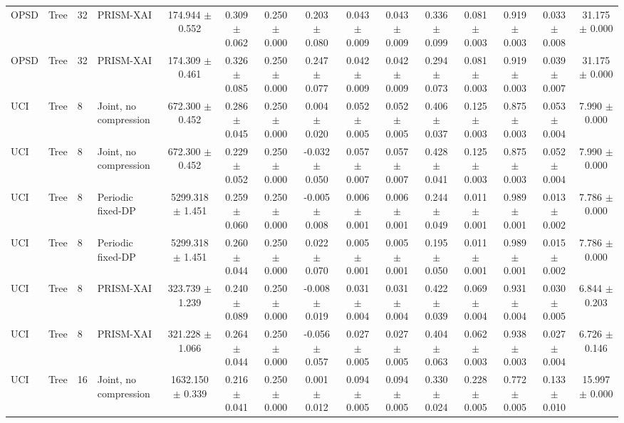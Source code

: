 \begin{table}[t]
\begin{tabular}{llllccccccccccc}
OPSD & Tree & 32 & PRISM-XAI & 174.944 $\pm$ 0.552 & 0.309 $\pm$ 0.062 & 0.250 $\pm$ 0.000 & 0.203 $\pm$ 0.080 & 0.043 $\pm$ 0.009 & 0.043 $\pm$ 0.009 & 0.336 $\pm$ 0.099 & 0.081 $\pm$ 0.003 & 0.919 $\pm$ 0.003 & 0.033 $\pm$ 0.008 & 31.175 $\pm$ 0.000 \\
OPSD & Tree & 32 & PRISM-XAI & 174.309 $\pm$ 0.461 & 0.326 $\pm$ 0.085 & 0.250 $\pm$ 0.000 & 0.247 $\pm$ 0.077 & 0.042 $\pm$ 0.009 & 0.042 $\pm$ 0.009 & 0.294 $\pm$ 0.073 & 0.081 $\pm$ 0.003 & 0.919 $\pm$ 0.003 & 0.039 $\pm$ 0.007 & 31.175 $\pm$ 0.000 \\
UCI & Tree & 8 & Joint, no compression & 672.300 $\pm$ 0.452 & 0.286 $\pm$ 0.045 & 0.250 $\pm$ 0.000 & 0.004 $\pm$ 0.020 & 0.052 $\pm$ 0.005 & 0.052 $\pm$ 0.005 & 0.406 $\pm$ 0.037 & 0.125 $\pm$ 0.003 & 0.875 $\pm$ 0.003 & 0.053 $\pm$ 0.004 & 7.990 $\pm$ 0.000 \\
UCI & Tree & 8 & Joint, no compression & 672.300 $\pm$ 0.452 & 0.229 $\pm$ 0.052 & 0.250 $\pm$ 0.000 & -0.032 $\pm$ 0.050 & 0.057 $\pm$ 0.007 & 0.057 $\pm$ 0.007 & 0.428 $\pm$ 0.041 & 0.125 $\pm$ 0.003 & 0.875 $\pm$ 0.003 & 0.052 $\pm$ 0.004 & 7.990 $\pm$ 0.000 \\
UCI & Tree & 8 & Periodic fixed-DP & 5299.318 $\pm$ 1.451 & 0.259 $\pm$ 0.060 & 0.250 $\pm$ 0.000 & -0.005 $\pm$ 0.008 & 0.006 $\pm$ 0.001 & 0.006 $\pm$ 0.001 & 0.244 $\pm$ 0.049 & 0.011 $\pm$ 0.001 & 0.989 $\pm$ 0.001 & 0.013 $\pm$ 0.002 & 7.786 $\pm$ 0.000 \\
UCI & Tree & 8 & Periodic fixed-DP & 5299.318 $\pm$ 1.451 & 0.260 $\pm$ 0.044 & 0.250 $\pm$ 0.000 & 0.022 $\pm$ 0.070 & 0.005 $\pm$ 0.001 & 0.005 $\pm$ 0.001 & 0.195 $\pm$ 0.050 & 0.011 $\pm$ 0.001 & 0.989 $\pm$ 0.001 & 0.015 $\pm$ 0.002 & 7.786 $\pm$ 0.000 \\
UCI & Tree & 8 & PRISM-XAI & 323.739 $\pm$ 1.239 & 0.240 $\pm$ 0.089 & 0.250 $\pm$ 0.000 & -0.008 $\pm$ 0.019 & 0.031 $\pm$ 0.004 & 0.031 $\pm$ 0.004 & 0.422 $\pm$ 0.039 & 0.069 $\pm$ 0.004 & 0.931 $\pm$ 0.004 & 0.030 $\pm$ 0.005 & 6.844 $\pm$ 0.203 \\
UCI & Tree & 8 & PRISM-XAI & 321.228 $\pm$ 1.066 & 0.264 $\pm$ 0.044 & 0.250 $\pm$ 0.000 & -0.056 $\pm$ 0.057 & 0.027 $\pm$ 0.005 & 0.027 $\pm$ 0.005 & 0.404 $\pm$ 0.063 & 0.062 $\pm$ 0.003 & 0.938 $\pm$ 0.003 & 0.027 $\pm$ 0.004 & 6.726 $\pm$ 0.146 \\
UCI & Tree & 16 & Joint, no compression & 1632.150 $\pm$ 0.339 & 0.216 $\pm$ 0.041 & 0.250 $\pm$ 0.000 & 0.001 $\pm$ 0.012 & 0.094 $\pm$ 0.005 & 0.094 $\pm$ 0.005 & 0.330 $\pm$ 0.024 & 0.228 $\pm$ 0.005 & 0.772 $\pm$ 0.005 & 0.133 $\pm$ 0.010 & 15.997 $\pm$ 0.000 \\

\end{tabular}
\end{table}

